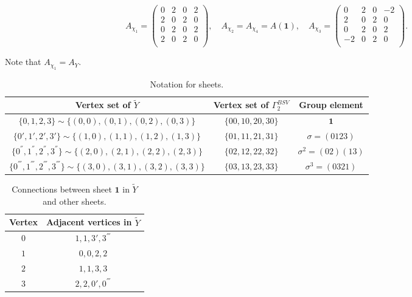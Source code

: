 \documentclass{article}
\newcommand{\G}{\Gamma}
\newcommand{\gid}{\mathbf{1}}
\newcommand{\Y}{\widetilde{Y}}
\begin{document}
$$
A_{\chi_1} = \begin{pmatrix}
0 & 2 & 0 & 2 \\
2 & 0 & 2 & 0 \\
0 & 2 & 0 & 2 \\
2 & 0 & 2 & 0 \\
\end{pmatrix}, \quad
A_{\chi_2} = A_{\chi_4} = A(\gid), \quad
A_{\chi_3} = \begin{pmatrix}
0 & 2 & 0 & -2 \\
2 & 0 & 2 & 0 \\
0 & 2 & 0 & 2 \\
-2 & 0 & 2 & 0 \\
\end{pmatrix}.
$$

Note that $A_{\chi_1} = A_Y$.

\begin{table}[ht]
	\caption{Notation for sheets.}
	\centering
	\begin{tabular}{c|c|c}
		Vertex set of $\Y$ & Vertex set of $\G_2^{BSV}$ & Group element \\
		\hline \hline
		$\{0,1,2,3\} \sim \{(0,0), (0,1), (0,2), (0,3)\}$ & $\{00, 10, 20, 30\}$ & $\gid$ \\
		$\{0',1',2',3'\} \sim \{(1,0), (1,1), (1,2), (1,3)\}$ & $\{01, 11, 21, 31\}$ & $\sigma = (0123)$ \\
		$\{0^{''},1^{''},2^{''},3^{''}\} \sim \{(2,0),(2,1), (2,2), (2,3)\}$ & $\{02, 12, 22, 32\}$ & $\sigma^2 = (02)(13)$ \\
		$\{0^{'''},1^{'''},2^{'''},3^{'''}\} \sim \{(3,0), (3,1), (3,2), (3,3)\}$ & $\{03, 13, 23, 33\}$ & $\sigma^3 = (0321)$ \\
	\end{tabular}
\end{table}

\begin{table}[ht]
	\caption{Connections between sheet $\gid$ in $\Y$ and other sheets.}
	\centering
	\begin{tabular}{c|c}
		Vertex & Adjacent vertices in $\Y$ \\
		\hline \hline
		$0$ & $1, 1, 3', 3^{'''}$ \\
		$1$ & $0, 0, 2, 2$ \\
		$2$ & $1, 1, 3, 3$ \\
		$3$ & $2, 2, 0', 0^{'''}$ \\
	\end{tabular}
\end{table}
\end{document}
